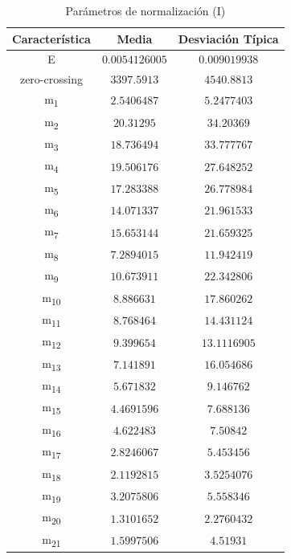 \documentclass[12pt]{article}
\begin{document}
\begin{table}
	\caption{Parámetros de normalización (I)}
	\centering
		\begin{tabular}{||c c c||}
			\hline
			Característica & Media & Desviación Típica  \\ [0.5ex]
			\hline\hline
			E & $0.0054126005$ & $0.009019938$ \\
			\hline
			zero-crossing & $3397.5913$ & $4540.8813$ \\
			\hline
			m\textsubscript{1} & $2.5406487$ & $5.2477403$ \\
			\hline
			m\textsubscript{2} & $20.31295$ & $34.20369$ \\
			\hline
			m\textsubscript{3} & $18.736494$ & $33.777767$ \\
			\hline
			m\textsubscript{4} & $19.506176$ & $27.648252$ \\
			\hline
			m\textsubscript{5} & $17.283388$ & $26.778984$ \\
			\hline
			m\textsubscript{6} & $14.071337$ & $21.961533$ \\
			\hline
			m\textsubscript{7} & $15.653144$ & $21.659325$ \\
			\hline
			m\textsubscript{8} & $7.2894015$ & $11.942419$ \\
			\hline
			m\textsubscript{9} & $10.673911$ & $22.342806$ \\
			\hline
			m\textsubscript{10} & $8.886631$ & $17.860262$ \\
			\hline
			m\textsubscript{11} & $8.768464$ & $14.431124$ \\
			\hline
			m\textsubscript{12} & $9.399654$ & $13.1116905$ \\
			\hline
			m\textsubscript{13} & $7.141891$ & $16.054686$ \\
			\hline
			m\textsubscript{14} & $5.671832$ & $9.146762$ \\
			\hline
			m\textsubscript{15} & $4.4691596$ & $7.688136$ \\
			\hline
			m\textsubscript{16} & $4.622483$ & $7.50842$ \\
			\hline
			m\textsubscript{17} & $2.8246067$ & $5.453456$ \\
			\hline
			m\textsubscript{18} & $2.1192815$ & $3.5254076$ \\
			\hline
			m\textsubscript{19} & $3.2075806$ & $5.558346$ \\
			\hline
			m\textsubscript{20} & $1.3101652$ & $2.2760432$ \\
			\hline
			m\textsubscript{21} & $1.5997506$ & $4.51931$ \\

\end{tabular}
\end{table}
\end{document}
